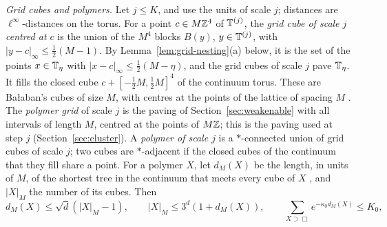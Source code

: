 \emph{Grid cubes and polymers.} Let $j\le K$, and use the units of scale $j$; distances are $\ell^\infty$-distances on the torus. For a point $c\in M\mathbb Z^4$ of $\mathbb T^{(j)}$, the \emph{grid cube of scale $j$ centred at $c$} is the union of the $M^4$ blocks $B(y)$, $y\in\mathbb T^{(j)}$, with $|y-c|_\infty\le\frac12(M-1)$. By Lemma~\ref{lem:grid-nesting}(a) below, it is the set of the points $x\in\mathbb T_\eta$ with $|x-c|_\infty\le\frac12(M-\eta)$, and the grid cubes of scale $j$ pave $\mathbb T_\eta$. It fills the closed cube $c+[-\frac12M,\frac12M]^4$ of the continuum torus. These are Ba\l aban's cubes of size $M$, with centres at the points of the lattice of spacing $M$ \cite[p.~257]{BalYM4I}. The \emph{polymer grid} of scale $j$ is the paving of Section~\ref{sec:weakenable} with all intervals of length $M$, centred at the points of $M\mathbb Z$; this is the paving used at step $j$ (Section~\ref{sec:cluster}). A \emph{polymer of scale $j$} is a $*$-connected union of grid cubes of scale $j$; two cubes are $*$-adjacent if the closed cubes of the continuum that they fill share a point. For a polymer $X$, let $d_M(X)$ be the length, in units of $M$, of the shortest tree in the continuum that meets every cube of $X$ \cite[(119)]{DimockI}, and $|X|_M$ the number of its cubes. Then \cite[(122), (123)]{DimockI}
\begin{equation}\label{eq:dM-facts}
d_M(X)\le\sqrt d(|X|_M-1),\qquad|X|_M\le3^d(1+d_M(X)),\qquad\sum_{X\supset\Box}e^{-\kappa_0d_M(X)}\le K_0 ,
\end{equation}
